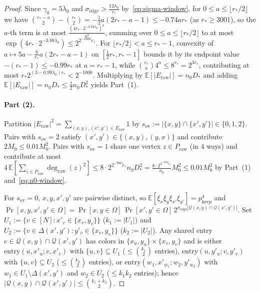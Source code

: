 \documentclass[11pt]{article}
\theoremstyle{definition}
\theoremstyle{remark}
\begin{document}
\begin{proof}
Since $\gamma_0 = 5\lambda_0$ and $\sigma_{\mathrm{edge}} > \frac{12\lambda_0}{r_*}$ by~\eqref{eq:sigma-window}, for $0 \le a \le \lfloor r_*/2 \rfloor$ we have $\binom{r_* - a}{2} - \binom{r_*}{2} = -\frac{1}{2}a(2 r_* - a - 1) \le -0.74 a r_*$ (as $r_* \ge 3001$), so the $a$-th term is at most $\frac{(4 r_* \cdot 2^{-3.88 \lambda_0})^a}{a!}$, summing over $0 \le a \le \lfloor r_*/2 \rfloor$ to at most $\exp(4 r_* \cdot 2^{-3.88\lambda_0}) \le 2^{2^{-1000} r_*}$. For $\lfloor r_*/2 \rfloor < a \le r_* - 1$, convexity of $a \mapsto 5 a - \frac{6}{r_*} a(2 r_* - a - 1)$ on $[\frac{1}{2} r_*, r_* - 1]$ bounds it by its endpoint value $-(r_* - 1) \le -0.99 r_*$ at $a = r_* - 1$, while $\binom{r_*}{a} 4^a \le 8^{r_*} = 2^{3 r_*}$, contributing at most $r_* 2^{(3 - 0.99\lambda_0) r_*} < 2^{-1000}$. Multiplying by $\mathbb{E}[|E_{\mathrm{raw}}|] = n_0 D_*$ and adding $\mathbb{E}[|E_{\mathrm{raw}}|] = n_0 D_* \le \frac{1}{2} n_0 D_*^2$ yields Part~(1).

\paragraph{Part (2).}
Partition $|E_{\mathrm{raw}}|^2 = \sum_{(x, y), (x', y') \in E_{\mathrm{raw}}} 1$ by $s_{\mathrm{ov}} := |\{x, y\} \cap \{x', y'\}| \in \{0, 1, 2\}$. Pairs with $s_{\mathrm{ov}} = 2$ satisfy $(x', y') \in \{(x, y), (y, x)\}$ and contribute $2 M_0 \le 0.01 M_0^2$. Pairs with $s_{\mathrm{ov}} = 1$ share one vertex $z \in P_{\mathrm{raw}}$ (in $4$ ways) and contribute at most $4\,\mathbb{E}[\sum_{z \in P_{\mathrm{raw}}} \deg_{\mathrm{raw}}(z)^2] \le 8 \cdot 2^{2^{-998} r_*} n_0 D_*^2 = \frac{8 \cdot 2^{2^{-998} r_*}}{n_0} M_0^2 \le 0.01 M_0^2$ by Part~(1) and~\eqref{eq:n0-window}.

For $s_{\mathrm{ov}} = 0$, $x, y, x', y'$ are pairwise distinct, so $\mathbb{E}[\xi_x \xi_y \xi_{x'} \xi_{y'}] = p_{\mathrm{keep}}^4$ and $\Pr[x, y, x', y' \in \Omega] = \Pr[x, y \in \Omega]\,\Pr[x', y' \in \Omega]\,2^{\sigma_{\mathrm{edge}} |\mathcal{Q}(x, y) \cap \mathcal{Q}(x', y')|}$. Set $U_1 := \{v \in [N] : x'_v \in \{x_v, y_v\}\}$ ($k_1 := |U_1|$) and $U_2 := \{v \in \Delta(x', y') : y'_v \in \{x_v, y_v\}\}$ ($k_2 := |U_2|$). Any shared entry $e \in \mathcal{Q}(x, y) \cap \mathcal{Q}(x', y')$ has colors in $\{x_u, y_u\} \times \{x_v, y_v\}$ and is either $\mathrm{entry}(u, x'_u; v, x'_v)$ with $\{u, v\} \subseteq U_1$ ($\le \binom{k_1}{2}$ entries), $\mathrm{entry}(u, y'_u; v, y'_v)$ with $\{u, v\} \subseteq U_2$ ($\le \binom{k_2}{2}$ entries), or $\mathrm{entry}(w_1, x'_{w_1}; w_2, y'_{w_2})$ with $w_1 \in U_1 \setminus \Delta(x', y')$ and $w_2 \in U_2$ ($\le k_1 k_2$ entries); hence $|\mathcal{Q}(x, y) \cap \mathcal{Q}(x', y')| \le \binom{k_1 + k_2}{2}$.


\end{proof}
\end{document}
